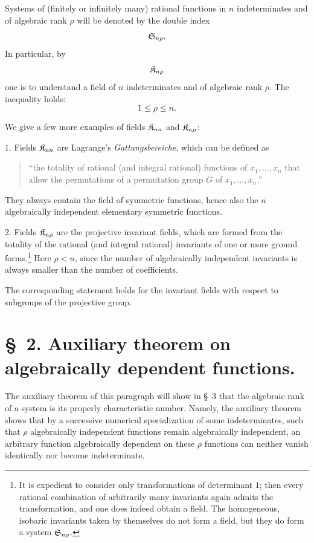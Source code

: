 \documentclass[11pt]{article}
\begin{document}
Systems of (finitely or infinitely many) rational functions in $n$ indeterminates and of algebraic rank $\rho$ will be denoted by the double index
\[
  \mathfrak{S}_{n\rho}.
\]
In particular, by
\[
  \mathfrak{K}_{n\rho}
\]
one is to understand a field of $n$ indeterminates and of algebraic rank $\rho$. The inequality holds:
\[
  1\leq \rho\leq n.
\]

We give a few more examples of fields $\mathfrak{K}_{nn}$ and $\mathfrak{K}_{n\rho}$:

1. Fields $\mathfrak{K}_{nn}$ are Lagrange's \emph{Gattungsbereiche}, which can be defined as
\begin{quote}
``the totality of rational (and integral rational) functions of $x_1,\ldots,x_n$ that allow the permutations of a permutation group $G$ of $x_1,\ldots,x_n$.''
\end{quote}
They always contain the field of symmetric functions, hence also the $n$ algebraically independent elementary symmetric functions.

2. Fields $\mathfrak{K}_{n\rho}$ are the projective invariant fields, which are formed from the totality of the rational (and integral rational) invariants of one or more ground forms.\footnote{It is expedient to consider only transformations of determinant $1$; then every rational combination of arbitrarily many invariants again admits the transformation, and one does indeed obtain a field. The homogeneous, isobaric invariants taken by themselves do not form a field, but they do form a system $\mathfrak{S}_{n\rho}$.} Here $\rho<n$, since the number of algebraically independent invariants is always smaller than the number of coefficients.

The corresponding statement holds for the invariant fields with respect to subgroups of the projective group.

\section*{\S\ 2. Auxiliary theorem on algebraically dependent functions.}

The auxiliary theorem of this paragraph will show in \S\ 3 that the algebraic rank of a system is its properly characteristic number. Namely, the auxiliary theorem shows that by a successive numerical specialization of some indeterminates, such that $\rho$ algebraically independent functions remain algebraically independent, an arbitrary function algebraically dependent on these $\rho$ functions can neither vanish identically nor become indeterminate.
\end{document}
